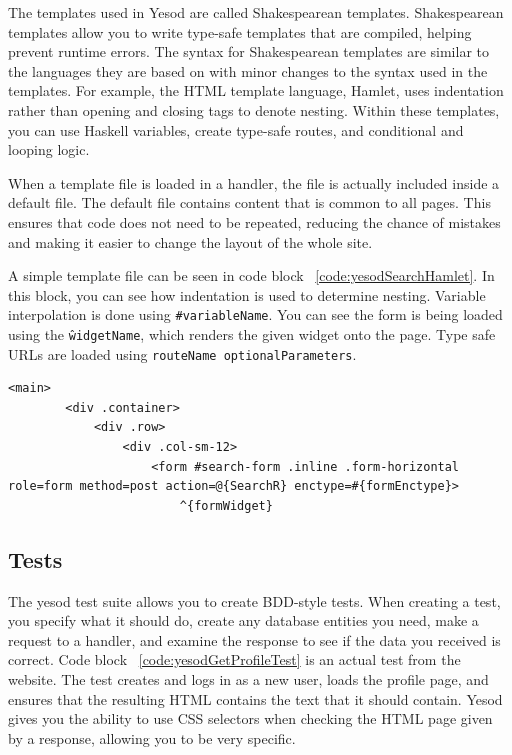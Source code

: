 The templates used in Yesod are called Shakespearean templates. Shakespearean templates
allow you to write type-safe templates that are compiled, helping prevent runtime errors.
The syntax for Shakespearean templates are similar to the languages they are based on
with minor changes to the syntax used in the templates. For example, the HTML template language, Hamlet,
uses indentation rather than opening and closing tags to denote nesting. Within these
templates, you can use Haskell variables, create type-safe routes, and conditional
and looping logic. \parencite[Shakespearean Templates]{yesodBook}

When a template file is loaded in a handler, the file is actually included inside
a default file. The default file contains content that is common to all pages. This
ensures that code does not need to be repeated, reducing the chance of mistakes and
making it easier to change the layout of the whole site.

A simple template file can be seen in code block ~\ref{code:yesodSearchHamlet}. In this
block, you can see how indentation is used to determine nesting. Variable interpolation
is done using \texttt{\#{variableName}}. You can see the form is being loaded using
the \texttt{\^{widgetName}}, which renders the given widget onto the page. Type safe
URLs are loaded using \texttt{\@{routeName optionalParameters}}.

\begin{lstlisting}[caption={GET request handler for getting user data},label={code:yesodSearchHamlet}]
    <main>
        <div .container>
            <div .row>
                <div .col-sm-12>
                    <form #search-form .inline .form-horizontal role=form method=post action=@{SearchR} enctype=#{formEnctype}>
                        ^{formWidget}

\end{lstlisting}

\subsection{Tests}
The yesod test suite allows you to create BDD-style tests. When creating a test,
you specify what it should do, create any database entities you need, make a
request to a handler, and examine the response to see if the data you received
is correct. Code block ~\ref{code:yesodGetProfileTest} is an actual test
from the website. The test creates and logs in as a new user, loads
the profile page, and ensures that the resulting HTML contains the text that
it should contain. Yesod gives you the ability to use CSS selectors when checking
the HTML page given by a response, allowing you to be very specific.

